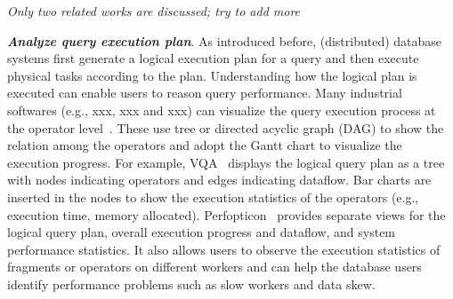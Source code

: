 \textit{Only two related works are discussed; try to add more} 

\emph{\textbf{Analyze query execution plan}}. As introduced before, (distributed) database systems first generate a logical execution plan for a query and then execute physical tasks according to the plan. Understanding how the logical plan is executed can enable users to reason query performance. Many industrial softwares (e.g., xxx, xxx and xxx) can visualize the query execution process at the operator level~\cite{tez-ui}. These use tree or directed acyclic graph (DAG) to show the relation among the operators and adopt the Gantt chart to visualize the execution progress. For example, VQA~\cite{simitsis2014vqa} displays the logical query plan as a tree with nodes indicating operators and edges indicating dataflow. Bar charts are inserted in the nodes to show the execution statistics of the operators (e.g., execution time, memory allocated). Perfopticon~\cite{moritz2015perfopticon} provides separate views for the logical query plan, overall execution progress and dataflow, and system performance statistics. It also allows users to observe the execution statistics of fragments or operators on different workers and can help the database users identify performance problems such as slow workers and data skew. 



